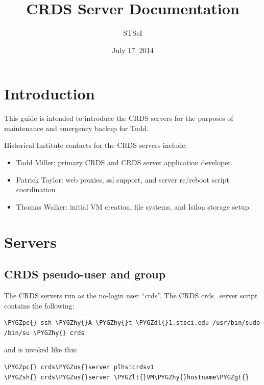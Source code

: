 \documentclass[letterpaper,10pt,english]{sphinxmanual}
\title{CRDS Server Documentation}
\date{July 17, 2014}
\author{STScI}
\def\PYGZus{\char`\_}
\def\PYGZlt{\char`\<}
\def\PYGZgt{\char`\>}
\def\PYGZsh{\char`\#}
\def\PYGZpc{\char`\%}
\def\PYGZdl{\char`\$}
\def\PYGZhy{\char`\-}
\begin{document}
\maketitle
\tableofcontents
{}\label{index::doc}



\chapter{Introduction}
\label{server_guide:introduction}\label{server_guide::doc}\label{server_guide:crds-server-guide}
This guide is intended to introduce the CRDS servers for the purposes of maintenance and emergency backup for Todd.

Historical Institute contacts for the CRDS servers include:
\begin{itemize}
\item {} 
Todd Miller:    primary CRDS and CRDS server application developer.

\item {} 
Patrick Taylor: web proxies, ssl support, and server rc/reboot script coordination

\item {} 
Thomas Walker:  initial VM creation, file systems, and Isilon storage setup.

\end{itemize}


\chapter{Servers}
\label{server_guide:servers}

\section{CRDS pseudo-user and group}
\label{server_guide:crds-pseudo-user-and-group}
The CRDS servers run as the no-login user ``crds''.  The CRDS  crds\_server script contains the following:

\begin{Verbatim}[commandchars=\\\{\}]
\PYGZpc{} ssh \PYGZhy{}A \PYGZhy{}t \PYGZdl{}1.stsci.edu /usr/bin/sudo /bin/su \PYGZhy{} crds
\end{Verbatim}

and is invoked like this:

\begin{Verbatim}[commandchars=\\\{\}]
\PYGZpc{} crds\PYGZus{}server plhstcrdsv1
\PYGZsh{} crds\PYGZus{}server \PYGZlt{}VM\PYGZhy{}hostname\PYGZgt{}
\end{Verbatim}
\end{document}

